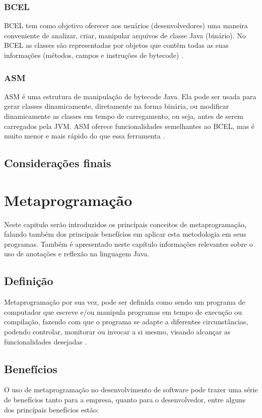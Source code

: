 \documentclass[tc,openright]{iiufrgs}
\begin{document}
\subsection {BCEL}
 BCEL tem como objetivo oferecer aos usuários (desenvolvedores) uma maneira conveniente de analizar, criar, manipular arquivos de classe Java (binário). No BCEL as classes são representadas por objetos que contêm todas as suas informações (métodos, campos e instruções de bytecode) \cite{bcel}.
\subsection {ASM}
ASM é uma estrutura de manipulação de bytecode Java. Ela pode ser usada para gerar classes dinamicamente, diretamente na forma binária, ou modificar dinamicamente as classes em tempo de carregamento, ou seja, antes de serem carregados pela JVM. ASM oferece funcionalidades semelhantes ao BCEL, mas é muito menor e mais rápido do que essa ferramenta \cite{asmjavasource}.

\section{Considerações finais}

\chapter{Metaprogramação}
Neste capitulo serão introduzidos  os princípais conceitos de metaprogramação, falando também dos principais benefícios em aplicar esta metodologia em seus programas. Também é apresentado neste capítulo informações relevantes sobre o uso de anotações e reflexão na linguagem Java.

\section{Definição}

Metaprogramação por sua vez, pode ser definida como sendo um programa de computador que escreve e/ou manipula programas em tempo de execução ou compilação, fazendo com que o programa se adapte a diferentes circunstâncias, podendo controlar, monitorar ou invocar a si mesmo, visando alcançar as funcionalidades desejadas \cite{hazzard2013metaprogramming}.
\section{Benefícios}
O uso de metaprogramação no desenvolvimento de software pode trazer uma série de benefícios tanto para a empresa, quanto para o desenvolvedor, entre alguns dos princípais benefícios estão:
\end{document}
